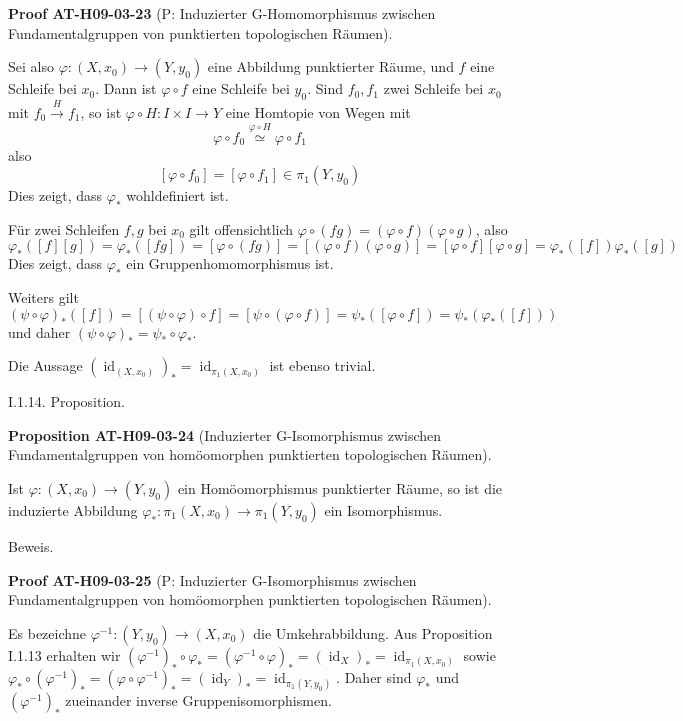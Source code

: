 \documentclass[10pt, letterpaper]{article}
\newcommand{\CustomHeading}[3]{%
  \par\medskip\noindent%
  \textbf{#1 #2} \textnormal{(#3)}.\enskip%
}
\newenvironment{PROP}[2]{\begin{unitbox}\CustomHeading{Proposition}{#1}{#2}}{\end{unitbox}}
\newenvironment{PROOF}[2]{\begin{unitbox}\CustomHeading{Proof}{#1}{#2}}{\end{unitbox}}
\begin{document}
\begin{PROOF}{AT-H09-03-23}{P: Induzierter G-Homomorphismus zwischen Fundamentalgruppen von punktierten topologischen Räumen}
Sei also $\varphi:\left(X, x_{0}\right) \rightarrow\left(Y, y_{0}\right)$ eine Abbildung punktierter Räume, und $f$ eine Schleife bei $x_{0}$. Dann ist $\varphi \circ f$ eine Schleife bei $y_{0}$. Sind $f_{0}, f_{1}$ zwei Schleife bei $x_{0}$ mit $f_{0} \xrightarrow{H} f_{1}$, so ist $\varphi \circ H: I \times I \rightarrow Y$ eine Homtopie von Wegen mit 
$$\varphi \circ f_{0} \stackrel{\varphi \circ H}{\simeq} \varphi \circ f_{1}$$ 
also 
$$\left[\varphi \circ f_{0}\right]=\left[\varphi \circ f_{1}\right] \in \pi_{1}\left(Y, y_{0}\right)$$ 
Dies zeigt, dass $\varphi_{*}$ wohldefiniert ist. 

Für zwei Schleifen $f, g$ bei $x_{0}$ gilt offensichtlich $\varphi \circ(f g)=(\varphi \circ f)(\varphi \circ g)$, also 
$$\varphi_{*}([f][g])=\varphi_{*}([f g])=[\varphi \circ(f g)]=[(\varphi \circ f)(\varphi \circ g)]=[\varphi \circ f][\varphi \circ g]=\varphi_{*}([f]) \varphi_{*}([g])$$ 
Dies zeigt, dass $\varphi_{*}$ ein Gruppenhomomorphismus ist. 

Weiters gilt 
$$(\psi \circ \varphi)_{*}([f])=[(\psi \circ \varphi) \circ f]=[\psi \circ(\varphi \circ f)]=\psi_{*}([\varphi \circ f])=\psi_{*}\left(\varphi_{*}([f])\right)$$ 
und daher $(\psi \circ \varphi)_{*}=\psi_{*} \circ \varphi_{*}$. 

Die Aussage $\left(\operatorname{id}_{\left(X, x_{0}\right)}\right)_{*}=\operatorname{id}_{\pi_{1}\left(X, x_{0}\right)}$ ist ebenso trivial.
\end{PROOF}


I.1.14. Proposition. 


\begin{PROP}{AT-H09-03-24}{Induzierter G-Isomorphismus zwischen Fundamentalgruppen von homöomorphen punktierten topologischen Räumen}
Ist $\varphi:\left(X, x_{0}\right) \rightarrow\left(Y, y_{0}\right)$ ein Homöomorphismus punktierter Räume, so ist die induzierte Abbildung $\varphi_{*}: \pi_{1}\left(X, x_{0}\right) \rightarrow \pi_{1}\left(Y, y_{0}\right)$ ein Isomorphismus.
\end{PROP}

Beweis. 

\begin{PROOF}{AT-H09-03-25}{P: Induzierter G-Isomorphismus zwischen Fundamentalgruppen von homöomorphen punktierten topologischen Räumen}
Es bezeichne $\varphi^{-1}:\left(Y, y_{0}\right) \rightarrow\left(X, x_{0}\right)$ die Umkehrabbildung. Aus Proposition I.1.13 erhalten wir $\left(\varphi^{-1}\right)_{*} \circ \varphi_{*}=\left(\varphi^{-1} \circ \varphi\right)_{*}=\left(\operatorname{id}_{X}\right)_{*}=\operatorname{id}_{\pi_{1}\left(X, x_{0}\right)}$ sowie $\varphi_{*} \circ\left(\varphi^{-1}\right)_{*}=\left(\varphi \circ \varphi^{-1}\right)_{*}=\left(\operatorname{id}_{Y}\right)_{*}=\operatorname{id}_{\pi_{1}\left(Y, y_{0}\right)}$. Daher sind $\varphi_{*}$ und $\left(\varphi^{-1}\right)_{*}$ zueinander inverse Gruppenisomorphismen.
\end{PROOF}
\end{document}

